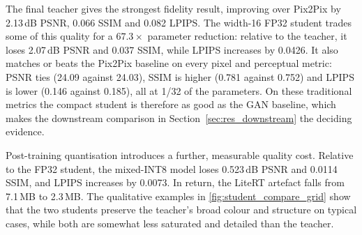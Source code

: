 \begin{table}[!htbp]
\centering
\scriptsize
\setlength{\tabcolsep}{2.5pt}
\caption{Image-quality and artefact-size comparison on the canonical held-out test split. The FP32 student also has a 7.6\,MB ONNX artefact.}
\label{tab:res_imagequality}
\end{table}

The final teacher gives the strongest fidelity result, improving over Pix2Pix by 2.13\,dB PSNR, 0.066 SSIM and 0.082 LPIPS. The width-16 FP32 student trades some of this quality for a $67.3\times$ parameter reduction: relative to the teacher, it loses 2.07\,dB PSNR and 0.037 SSIM, while LPIPS increases by 0.0426. It also matches or beats the Pix2Pix baseline on every pixel and perceptual metric: PSNR ties (24.09 against 24.03), SSIM is higher (0.781 against 0.752) and LPIPS is lower (0.146 against 0.185), all at 1/32 of the parameters. On these traditional metrics the compact student is therefore as good as the GAN baseline, which makes the downstream comparison in Section~\ref{sec:res_downstream} the deciding evidence.

Post-training quantisation introduces a further, measurable quality cost. Relative to the FP32 student, the mixed-INT8 model loses 0.523\,dB PSNR and 0.0114 SSIM, and LPIPS increases by 0.0073. In return, the LiteRT artefact falls from 7.1\,MB to 2.3\,MB. The qualitative examples in \autoref{fig:student_compare_grid} show that the two students preserve the teacher's broad colour and structure on typical cases, while both are somewhat less saturated and detailed than the teacher.

